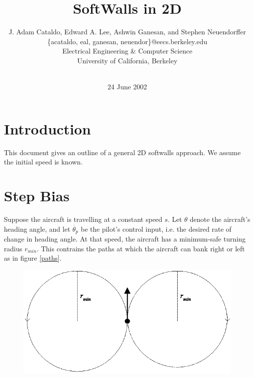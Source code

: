 \documentclass[11pt]{article}
\begin{document}


\title{SoftWalls in 2D}
\author{J. Adam Cataldo, Edward A. Lee, Ashwin Ganesan, and
Stephen Neuendorffer\\ \{acataldo, eal, ganesan, neuendor\}@eecs.berkeley.edu\\ Electrical
Engineering \& Computer Science\\ University of California, Berkeley\\
\\} 
\date{24 June 2002}

\maketitle


\section{Introduction}

This document gives an outline of a general 2D softwalls approach.  We
assume the initial speed is known.



\section{Step Bias}


Suppose the aircraft is travelling at a constant speed $s$.  Let
$\theta$ denote the aircraft's heading angle, and let
$\dot{\theta_{p}}$ be the pilot's control input, i.e. the desired rate
of change in heading angle.  At that speed, the aircraft has a
minimum-safe turning radius $r_{min}$.  This contrains the paths at
which the aircraft can bank right or left as in figure \ref{paths}.

\begin{figure}[btp]
\centering
\includegraphics[width=5in]{aircraftpaths.eps}
\end{figure}
\end{document}
